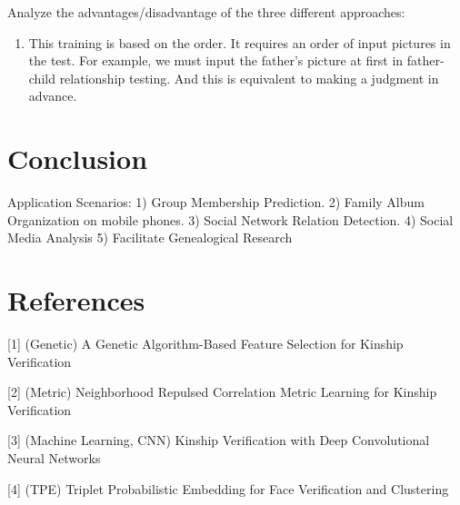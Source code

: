 \documentclass{article}
\begin{document}
Analyze the advantages/disadvantage of the three different approaches:
\begin{enumerate}[(1)]
%
\item This training is based on the order. It requires an order of input pictures in the test. For example, we must input the father’s picture at first in father-child relationship testing. And this is equivalent to making a judgment in advance.


\end{enumerate}

\section{Conclusion}
Application Scenarios:
1) Group Membership Prediction.
2) Family Album Organization on mobile phones.
3) Social Network Relation Detection.
4) Social Media Analysis
5) Facilitate Genealogical Research

\section*{References}
[1] (Genetic) A Genetic Algorithm-Based Feature Selection for Kinship Verification

[2] (Metric) Neighborhood Repulsed Correlation Metric Learning for Kinship Verification

[3] (Machine Learning, CNN) Kinship Verification with Deep Convolutional Neural Networks

[4] (TPE) Triplet Probabilistic Embedding for Face Verification and Clustering
\end{document}
